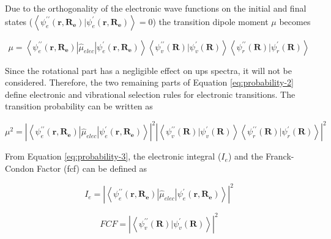\begin{refsection}
\noindent Due to the orthogonality of the electronic wave functions on the initial and final states ($\left\langle\psi^{\prime\prime}_{e}(\mathbf{r},\mathbf{R_e})|\psi^{\prime}_{e}(\mathbf{r},\mathbf{R_e})\right\rangle = 0$) the transition dipole moment $\mu$ becomes

\begin{equation}
\mu =\left\langle\psi^{\prime\prime}_{e}(\mathbf{r},\mathbf{R_e})|\hat{\mu}_{elec}|\psi^{\prime}_{e}(\mathbf{r},\mathbf{R_e})\right\rangle\left\langle{\psi^{\prime\prime}_{v}(\mathbf{R})|\psi^{\prime}_{v}(\mathbf{R})}\right\rangle\left\langle\psi^{\prime\prime}_{r}(\mathbf{R})|\psi^{\prime}_{r}(\mathbf{R})\right\rangle
\label{eq:probability-2}
\end{equation}

\noindent Since the rotational part has a negligible effect on \acrshort{ups} spectra, it will not be considered. Therefore, the two remaining parts of Equation \ref{eq:probability-2} define electronic and vibrational selection rules for electronic transitions. The transition probability can be written as

\begin{equation}
\mu^2 =\left|\left\langle\psi^{\prime\prime}_{e}(\mathbf{r},\mathbf{R_e})|\hat{\mu}_{elec}|\psi^{\prime}_{e}(\mathbf{r},\mathbf{R_e})\right\rangle\right|^2\left|\left\langle{\psi^{\prime\prime}_{v}(\mathbf{R})|\psi^{\prime}_{v}(\mathbf{R})}\right\rangle\left\langle\psi^{\prime\prime}_{r}(\mathbf{R})|\psi^{\prime}_{r}(\mathbf{R})\right\rangle\right|^2
\label{eq:probability-3}
\end{equation}

\noindent From Equation \ref{eq:probability-3}, the electronic integral ($I_e$) and the Franck-Condon Factor (\acrshort{fcf}) can be defined as

\begin{equation}
I_e =\left|\left\langle\psi^{\prime\prime}_{e}(\mathbf{r},\mathbf{R_e})|\hat{\mu}_{elec}|\psi^{\prime}_{e}(\mathbf{r},\mathbf{R_e})\right\rangle\right|^2
\label{eq:electronic-part}
\end{equation}

\begin{equation}
FCF =\left|\left\langle{\psi^{\prime\prime}_{v}(\mathbf{R})|\psi^{\prime}_{v}(\mathbf{R})}\right\rangle\right|^2
\label{eq:CFC}
\end{equation}




\end{refsection}
